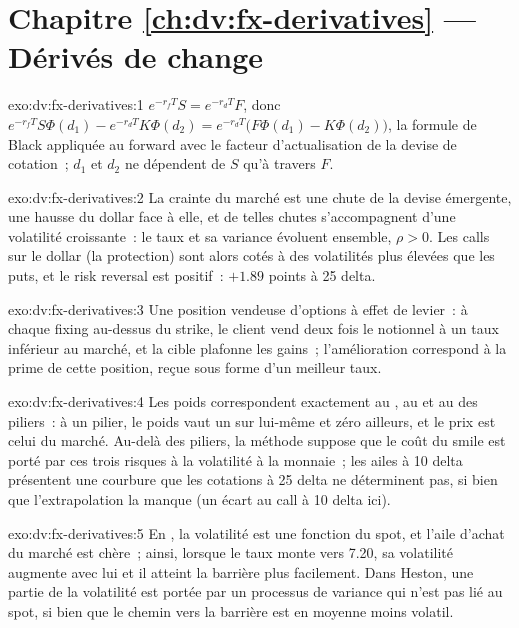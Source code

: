 \section*{Chapitre \ref{ch:dv:fx-derivatives} --- Dérivés de change}

\begin{solution}{exo:dv:fx-derivatives:1}
$e^{-r_fT}S=e^{-r_dT}F$, donc $e^{-r_fT}S\Phi(d_1)-e^{-r_dT}K\Phi(d_2)=e^{-r_dT}\bigl(F\Phi(d_1)-K\Phi(d_2)\bigr)$, la formule de Black appliquée au forward avec
le facteur d'actualisation de la devise de cotation~; $d_1$ et $d_2$ ne dépendent de $S$ qu'à travers $F$.
\end{solution}

\begin{solution}{exo:dv:fx-derivatives:2}
La crainte du marché est une chute de la devise émergente, une hausse du dollar face à elle, et de telles chutes s'accompagnent d'une volatilité croissante~: le taux et sa
variance évoluent ensemble, $\rho>0$. Les calls sur le dollar (la protection) sont alors cotés à des volatilités plus élevées que les puts, et le risk reversal est
positif~: $+1.89$ points à 25 delta.
\end{solution}

\begin{solution}{exo:dv:fx-derivatives:3}
Une position vendeuse d'options à effet de levier~: à chaque fixing au-dessus du strike, le client vend deux fois le notionnel à un taux inférieur au marché, et la cible plafonne
les gains~; l'amélioration correspond à la prime de cette position, reçue sous forme d'un meilleur taux.
\end{solution}

\begin{solution}{exo:dv:fx-derivatives:4}
Les poids correspondent exactement au , au  et au  des piliers~: à un pilier, le poids vaut un sur lui-même et zéro ailleurs, et le prix est celui
du marché. Au-delà des piliers, la méthode suppose que le coût du smile est porté par ces trois risques à la volatilité à la monnaie~; les ailes à 10 delta présentent une
courbure que les cotations à 25 delta ne déterminent pas, si bien que l'extrapolation la manque (un écart au call à 10 delta ici).
\end{solution}

\begin{solution}{exo:dv:fx-derivatives:5}
En , la volatilité est une fonction du spot, et l'aile d'achat du marché est chère~; ainsi, lorsque le taux monte vers 7.20, sa volatilité
augmente avec lui et il atteint la barrière plus facilement. Dans Heston, une partie de la volatilité est portée par un processus de variance qui n'est pas lié au spot, si bien que
le chemin vers la barrière est en moyenne moins volatil.
\end{solution}

